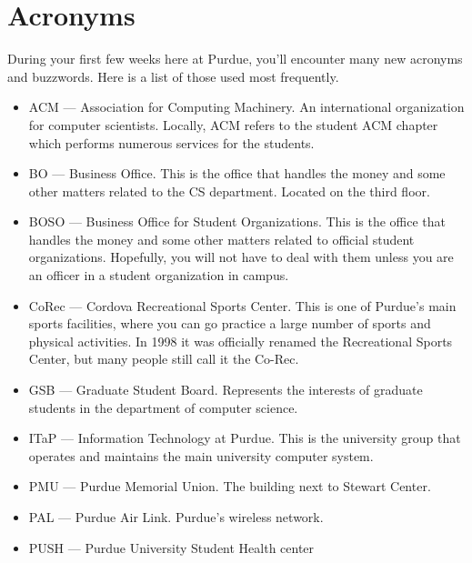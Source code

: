\section{Acronyms}

During your first few weeks here at Purdue, you'll encounter many new acronyms and buzzwords. Here is a list of those used most frequently.

\begin{itemize}
	\item ACM --- Association for Computing Machinery. An international organization for computer scientists. Locally, ACM refers to the student ACM chapter which performs numerous services for the students.

	\item BO --- Business Office. This is the office that handles the money and some other matters related to the CS department. Located on the third floor.

	\item BOSO --- Business Office for Student Organizations. This is the office that handles the money and some other matters related to official student organizations. Hopefully, you will not have to deal with them unless you are an officer in a student organization in campus.

	\item CoRec --- Cordova Recreational Sports Center. This is one of Purdue's main sports facilities, where you can go practice a large number of sports and physical activities. In 1998 it was officially renamed the Recreational Sports Center, but many people still call it the Co-Rec.

	\item GSB --- Graduate Student Board. Represents the interests of graduate students in the department of computer science.

	\item ITaP --- Information Technology at Purdue. This is the university group that operates and maintains the main university computer system.

	\item PMU --- Purdue Memorial Union. The building next to Stewart Center.

	\item PAL --- Purdue Air Link. Purdue's wireless network.

	\item PUSH --- Purdue University Student Health center

\end{itemize}